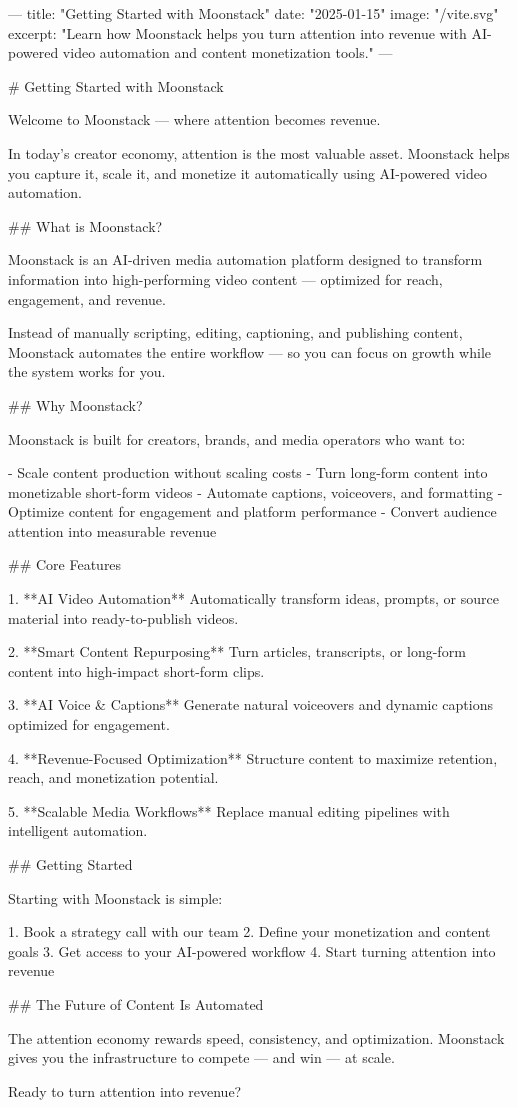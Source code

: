 ---
title: "Getting Started with Moonstack"
date: "2025-01-15"
image: "/vite.svg"
excerpt: "Learn how Moonstack helps you turn attention into revenue with AI-powered video automation and content monetization tools."
---

# Getting Started with Moonstack

Welcome to Moonstack — where attention becomes revenue.

In today’s creator economy, attention is the most valuable asset. Moonstack helps you capture it, scale it, and monetize it automatically using AI-powered video automation.

## What is Moonstack?

Moonstack is an AI-driven media automation platform designed to transform information into high-performing video content — optimized for reach, engagement, and revenue.

Instead of manually scripting, editing, captioning, and publishing content, Moonstack automates the entire workflow — so you can focus on growth while the system works for you.

## Why Moonstack?

Moonstack is built for creators, brands, and media operators who want to:

- Scale content production without scaling costs  
- Turn long-form content into monetizable short-form videos  
- Automate captions, voiceovers, and formatting  
- Optimize content for engagement and platform performance  
- Convert audience attention into measurable revenue  

## Core Features

1. **AI Video Automation**  
   Automatically transform ideas, prompts, or source material into ready-to-publish videos.

2. **Smart Content Repurposing**  
   Turn articles, transcripts, or long-form content into high-impact short-form clips.

3. **AI Voice & Captions**  
   Generate natural voiceovers and dynamic captions optimized for engagement.

4. **Revenue-Focused Optimization**  
   Structure content to maximize retention, reach, and monetization potential.

5. **Scalable Media Workflows**  
   Replace manual editing pipelines with intelligent automation.

## Getting Started

Starting with Moonstack is simple:

1. Book a strategy call with our team  
2. Define your monetization and content goals  
3. Get access to your AI-powered workflow  
4. Start turning attention into revenue  

## The Future of Content Is Automated

The attention economy rewards speed, consistency, and optimization.  
Moonstack gives you the infrastructure to compete — and win — at scale.

Ready to turn attention into revenue?